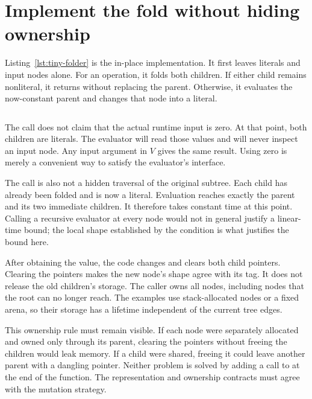 \section{Implement the fold without hiding ownership}
\label{sec:tiny-fold-implementation}

Listing~\ref{lst:tiny-folder} is the in-place implementation.
It first leaves literals and input nodes alone.
For an operation, it folds both children.
If either child remains nonliteral, it returns without replacing the parent.
Otherwise, it evaluates the now-constant parent and changes that node into a literal.

\begin{listing}
  \inputminted[firstline=22,lastline=36]{c}{example-code/ch01/expr.c}
  \caption{The in-place folder reuses the parent node for a literal result.}
  \label{lst:tiny-folder}
\end{listing}

The call  does not claim that the actual runtime input is zero.
At that point, both children are literals.
The evaluator will read those values and will never inspect an input node.
Any input argument in $V$ gives the same result.
Using zero is merely a convenient way to satisfy the evaluator's interface.

The call is also not a hidden traversal of the original subtree.
Each child has already been folded and is now a literal.
Evaluation reaches exactly the parent and its two immediate children.
It therefore takes constant time at this point.
Calling a recursive evaluator at every node would not in general justify a linear-time bound; the local shape established by the condition is what justifies the bound here.

After obtaining the value, the code changes  and clears both child pointers.
Clearing the pointers makes the new node's shape agree with its tag.
It does not release the old children's storage.
The caller owns all nodes, including nodes that the root can no longer reach.
The examples use stack-allocated nodes or a fixed arena, so their storage has a lifetime independent of the current tree edges.

This ownership rule must remain visible.
If each node were separately allocated and owned only through its parent, clearing the pointers without freeing the children would leak memory.
If a child were shared, freeing it could leave another parent with a dangling pointer.
Neither problem is solved by adding a call to  at the end of the function.
The representation and ownership contracts must agree with the mutation strategy.

